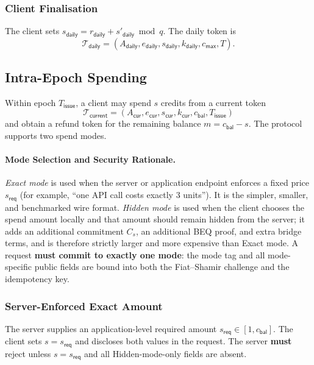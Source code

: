 \documentclass[11pt]{article}
\theoremstyle{definitionstyle}
\theoremstyle{plain}
\begin{document}
\subsubsection{Client Finalisation}
The client sets $s_{\mathsf{daily}} = r_{\mathsf{daily}} + s'_{\mathsf{daily}} \bmod q$. The daily token is
\[
\mathcal{T}_{\mathsf{daily}} = (A_{\mathsf{daily}}, e_{\mathsf{daily}}, s_{\mathsf{daily}}, k_{\mathsf{daily}}, c_{\mathsf{max}}, T).
\]

\subsection{Intra-Epoch Spending}

Within epoch $T_{\mathsf{issue}}$, a client may spend $s$ credits from a current token
\[
\mathcal{T}_{\mathsf{current}} = (A_{\mathsf{cur}}, e_{\mathsf{cur}}, s_{\mathsf{cur}}, k_{\mathsf{cur}}, c_{\mathsf{bal}}, T_{\mathsf{issue}})
\]
and obtain a refund token for the remaining balance $m = c_{\mathsf{bal}} - s$.
The protocol supports two spend modes.

\paragraph{Mode Selection and Security Rationale.}
\emph{Exact mode} is used when the server or application endpoint enforces a fixed price $s_{\mathsf{req}}$ (for example, ``one API call costs exactly 3 units''). It is the simpler, smaller, and benchmarked wire format. \emph{Hidden mode} is used when the client chooses the spend amount locally and that amount should remain hidden from the server; it adds an additional commitment $C_s$, an additional BEQ proof, and extra bridge terms, and is therefore strictly larger and more expensive than Exact mode. A request \textbf{must commit to exactly one mode}: the mode tag and all mode-specific public fields are bound into both the Fiat--Shamir challenge and the idempotency key.

\subsubsection{Server-Enforced Exact Amount}
\label{sec:spend-exact}

The server supplies an application-level required amount $s_{\mathsf{req}} \in [1, c_{\mathsf{bal}}]$. The client sets $s = s_{\mathsf{req}}$ and discloses both values in the request. The server \textbf{must} reject unless $s = s_{\mathsf{req}}$ and all Hidden-mode-only fields are absent.
\end{document}
